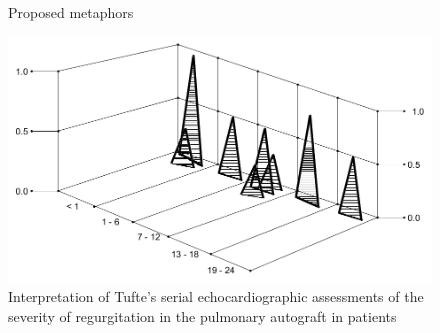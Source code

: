 \begin{figure}
    \centering
    \caption{Proposed metaphors}
\end{figure}

\begin{figure}
  \centering
    \includegraphics[width=\linewidth]{figures/tufte1983visual}
  \caption{Interpretation of Tufte's serial echocardiographic assessments of the severity of
  regurgitation in the pulmonary autograft in patients~\cite{tufte1983visual}}
  \label{fig:tufte1983visual}
\end{figure}

